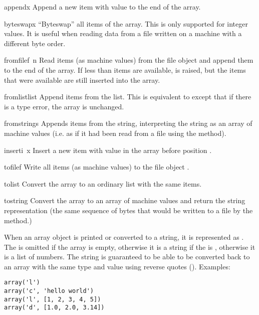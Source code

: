 \begin{funcdesc}{append}{x}
Append a new item with value  to the end of the array.
\end{funcdesc}

\begin{funcdesc}{byteswap}{x}
``Byteswap'' all items of the array.  This is only supported for
integer values.  It is useful when reading data from a file written
on a machine with a different byte order.
\end{funcdesc}

\begin{funcdesc}{fromfile}{f\, n}
Read  items (as machine values) from the file object 
and append them to the end of the array.  If less than  items
are available,  is raised, but the items that were
available are still inserted into the array.
\end{funcdesc}

\begin{funcdesc}{fromlist}{list}
Append items from the list.  This is equivalent to
except that if there is a type error, the array is unchanged.
\end{funcdesc}

\begin{funcdesc}{fromstring}{s}
Appends items from the string, interpreting the string as an
array of machine values (i.e. as if it had been read from a
file using the  method).
\end{funcdesc}

\begin{funcdesc}{insert}{i\, x}
Insert a new item with value  in the array before position
.
\end{funcdesc}

\begin{funcdesc}{tofile}{f}
Write all items (as machine values) to the file object .
\end{funcdesc}

\begin{funcdesc}{tolist}{}
Convert the array to an ordinary list with the same items.
\end{funcdesc}

\begin{funcdesc}{tostring}{}
Convert the array to an array of machine values and return the
string representation (the same sequence of bytes that would
be written to a file by the  method.)
\end{funcdesc}

When an array object is printed or converted to a string, it is
represented as .  The
 is omitted if the array is empty, otherwise it is a
string if the  is , otherwise it is a list of
numbers.  The string is guaranteed to be able to be converted back to
an array with the same type and value using reverse quotes
().  Examples:

\bcode\begin{verbatim}
array('l')
array('c', 'hello world')
array('l', [1, 2, 3, 4, 5])
array('d', [1.0, 2.0, 3.14])
\end{verbatim}\ecode
